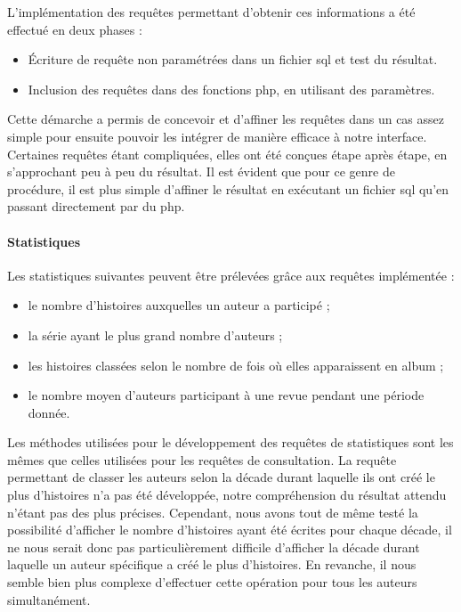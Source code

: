\documentclass[12pt]{article}
\begin{document}
L'implémentation des requêtes permettant d'obtenir ces informations a été effectué en deux phases :
\begin{itemize}
  \item Écriture de requête non paramétrées dans un fichier sql et test du résultat.
  \item Inclusion des requêtes dans des fonctions php, en utilisant des paramètres.
\end{itemize}

Cette démarche a permis de concevoir et d'affiner les requêtes dans un cas assez simple pour
ensuite pouvoir les intégrer de manière efficace à notre interface. Certaines requêtes étant
compliquées, elles ont été conçues étape après étape, en s'approchant peu à peu du résultat. Il est évident
que pour ce genre de procédure, il est plus simple d'affiner le résultat en exécutant un fichier sql qu'en
passant directement par du php.


\paragraph{Statistiques}
Les statistiques suivantes peuvent être prélevées grâce aux requêtes
implémentée :
\begin{itemize}
	\item le nombre d’histoires auxquelles un auteur a participé ;
	\item la série ayant le plus grand nombre d’auteurs ;
	\item les histoires classées selon le nombre de fois où elles apparaissent en album ;
	\item le nombre moyen d’auteurs participant à une revue pendant une période donnée.
\end{itemize}

Les méthodes utilisées pour le développement des requêtes de statistiques sont
les mêmes que celles utilisées pour les requêtes de consultation. La requête
permettant de classer les auteurs selon la décade durant laquelle ils ont créé
le plus d'histoires n'a pas été développée, notre compréhension du résultat
attendu n'étant pas des plus précises. Cependant, nous avons tout de même
testé la possibilité d'afficher le nombre d'histoires ayant été écrites pour
chaque décade, il ne nous serait donc pas particulièrement difficile
d'afficher la décade durant laquelle un auteur spécifique a créé le plus
d'histoires. En revanche, il nous semble bien plus complexe d'effectuer cette
opération pour tous les auteurs simultanément.
\end{document}
